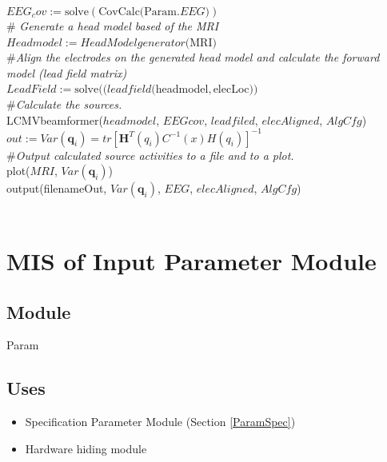 \documentclass[12pt, titlepage]{article}
\begin{document}
\noindent $ EEG_cov := \text{solve}(\text{CovCalc(Param.$EEG$)})$\\



\noindent \#\textit{ Generate a head model based of the MRI}\\

\noindent $Headmodel  := HeadModelgenerator ($MRI$)$\\


\noindent \#\textit{Align the electrodes on the generated head model and calculate the forward model (lead field matrix)} \\

\noindent $LeadField := \text{solve}( (leadfield($headmodel$, $elecLoc$))$ \\

\noindent \#\textit{Calculate the sources.}\\

 \noindent LCMVbeamformer($headmodel$, $EEGcov$, $leadfiled$, $elecAligned$, $AlgCfg$)\\
 
\noindent $out := Var(\mathbf q_i) = tr{[\mathbf H^T(q_i) C^{-1}(x) H(q_i)]^{-1}}$\\


\noindent \#\textit{Output calculated source activities to a file and to a plot. }\\



\noindent plot($MRI$, $Var(\mathbf q_i)$)\\

\noindent output(filenameOut, $Var(\mathbf q_i)$, $EEG$, $elecAligned$, $AlgCfg$)\\


~\newpage

\section{MIS of Input Parameter Module} \label{Param} 

\subsection{Module}

Param

\subsection{Uses}
\begin{itemize}
\item Specification Parameter Module (Section \ref{ParamSpec})
\item Hardware hiding module
\end{itemize}
\end{document}
